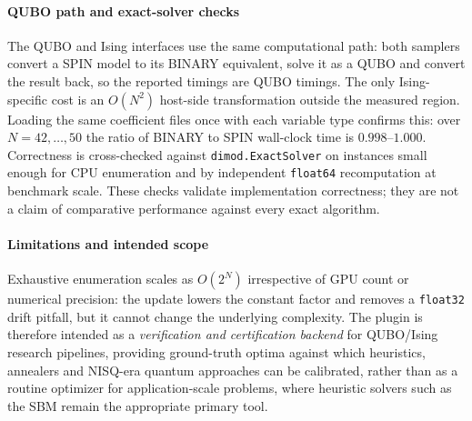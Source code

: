 \documentclass[preprint,12pt,a4paper]{elsarticle}
\begin{document}
\paragraph{QUBO path and exact-solver checks}
The QUBO and Ising interfaces use the same computational path: both samplers convert a SPIN
model to its BINARY equivalent, solve it as a QUBO and convert the result back, so the reported
timings are QUBO timings. The only Ising-specific cost is an $O(N^{2})$ host-side
transformation outside the measured region. Loading the same coefficient files once with each
variable type confirms this: over $N=42,\dots,50$ the ratio of BINARY to SPIN wall-clock time
is $0.998$--$1.000$. Correctness is cross-checked against \texttt{dimod.ExactSolver} on
instances small enough for CPU enumeration and by independent \texttt{float64} recomputation
at benchmark scale. These checks validate implementation correctness; they are not a claim of
comparative performance against every exact algorithm.

\paragraph{Limitations and intended scope}
Exhaustive enumeration scales as $O(2^N)$ irrespective of GPU count or
numerical precision: the update lowers the constant factor and removes a
\texttt{float32} drift pitfall, but it cannot change the underlying
complexity. The plugin is therefore intended as a \emph{verification and
certification backend} for QUBO/Ising research pipelines, providing
ground-truth optima against which heuristics, annealers and NISQ-era
quantum approaches can be calibrated, rather than as a routine optimizer
for application-scale problems, where heuristic solvers such as the SBM
remain the appropriate primary tool.
\end{document}
